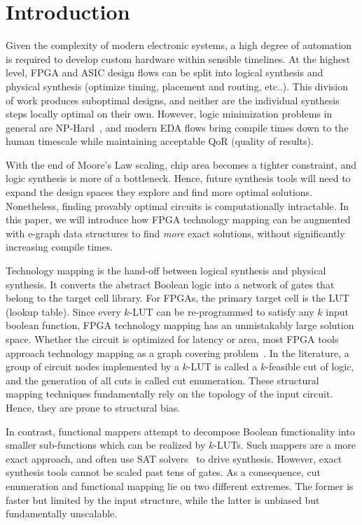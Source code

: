 \section{Introduction}\label{sec:intro}
Given the complexity of modern electronic systems, a high degree of automation
is required to develop custom hardware within sensible timelines. At the
highest level, FPGA and ASIC design flows can be split into logical synthesis
and physical synthesis (optimize timing, placement and routing, etc..). This
division of work produces suboptimal designs, and neither are the individual
synthesis steps locally optimal on their own. However, logic minimization
problems in general are NP-Hard~\cite{logicmin,twolevellogic}, and modern EDA
flows bring compile times down to the human timescale while maintaining
acceptable QoR (quality of results).

With the end of Moore's Law scaling, chip area becomes a tighter constraint,
and logic synthesis is more of a bottleneck. Hence, future synthesis tools will
need to expand the design spaces they explore and find more optimal solutions.
Nonetheless, finding provably optimal circuits is computationally intractable.
In this paper, we will introduce how FPGA technology mapping can be augmented
with e-graph data structures to find \textit{more} exact solutions, without
significantly increasing compile times.

Technology mapping is the hand-off between logical synthesis and physical
synthesis. It converts the abstract Boolean logic into a network of gates that
belong to the target cell library. For FPGAs, the primary target cell is the
LUT (lookup table). Since every $k$-LUT can be re-programmed to satisfy any $k$
input boolean function, FPGA technology mapping has an unmistakably large
solution space. Whether the circuit is optimized for latency or area, most FPGA
tools approach technology mapping as a graph covering problem~\cite{flowmap,
    daomap, attmap, imap}. In the literature, a group of circuit nodes implemented
by a $k$-LUT is called a $k$-feasible cut of logic, and the generation of all
cuts is called cut enumeration. These structural mapping techniques
fundamentally rely on the topology of the input circuit. Hence, they are prone
to structural bias.

In contrast, functional mappers attempt to decompose Boolean functionality into
smaller sub-functions which can be realized by $k$-LUTs. Such mappers are a
more exact approach, and often use SAT solvers~\cite{satmap,satmap2} to drive
synthesis. However, exact synthesis tools cannot be scaled past tens of gates.
As a consequence, cut enumeration and functional mapping lie on two different
extremes. The former is faster but limited by the input structure, while the
latter is unbiased but fundamentally unscalable.


